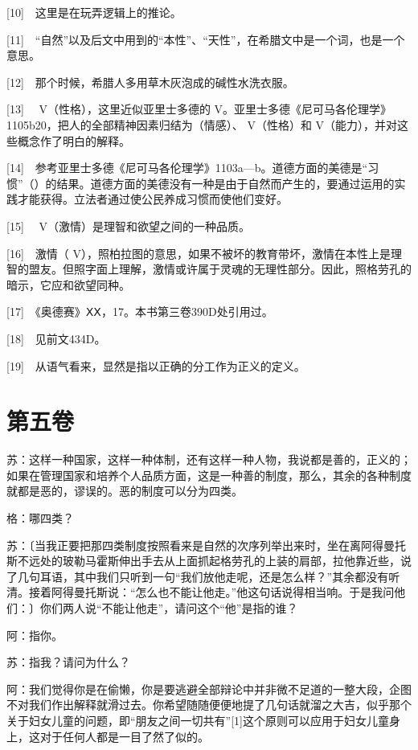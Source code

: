 \documentclass[12pt,oneside]{book}
\begin{document}
[10]　这里是在玩弄逻辑上的推论。

[11]　“自然”以及后文中用到的“本性”、“天性”，在希腊文中是一个词，也是一个意思。

[12]　那个时候，希腊人多用草木灰泡成的碱性水洗衣服。

[13]　 V（性格），这里近似亚里士多德的 V。亚里士多德《尼可马各伦理学》1105b20，把人的全部精神因素归结为（情感）、 V（性格）和 V（能力），并对这些概念作了明白的解释。

[14]　参考亚里士多德《尼可马各伦理学》1103a—b。道德方面的美德是“习惯”（）的结果。道德方面的美德没有一种是由于自然而产生的，要通过运用的实践才能获得。立法者通过使公民养成习惯而使他们变好。

[15]　 V（激情）是理智和欲望之间的一种品质。

[16]　激情（ V），照柏拉图的意思，如果不被坏的教育带坏，激情在本性上是理智的盟友。但照字面上理解，激情或许属于灵魂的无理性部分。因此，照格劳孔的暗示，它应和欲望同种。

[17]　《奥德赛》ⅩⅩ，17。本书第三卷390D处引用过。

[18]　见前文434D。

[19]　从语气看来，显然是指以正确的分工作为正义的定义。





\chapter{第五卷}

苏：这样一种国家，这样一种体制，还有这样一种人物，我说都是善的，正义的；如果在管理国家和培养个人品质方面，这是一种善的制度，那么，其余的各种制度就都是恶的，谬误的。恶的制度可以分为四类。

格：哪四类？

苏：〔当我正要把那四类制度按照看来是自然的次序列举出来时，坐在离阿得曼托斯不远处的玻勒马霍斯伸出手去从上面抓起格劳孔的上装的肩部，拉他靠近些，说了几句耳语，其中我们只听到一句“我们放他走呢，还是怎么样？”其余都没有听清。接着阿得曼托斯说：“怎么也不能让他走。”他这句话说得相当响。于是我问他们：〕你们两人说“不能让他走”，请问这个“他”是指的谁？

阿：指你。

苏：指我？请问为什么？

阿：我们觉得你是在偷懒，你是要逃避全部辩论中并非微不足道的一整大段，企图不对我们作出解释就滑过去。你希望随随便便地提了几句话就溜之大吉，似乎那个关于妇女儿童的问题，即“朋友之间一切共有”[1]这个原则可以应用于妇女儿童身上，这对于任何人都是一目了然了似的。
\end{document}
